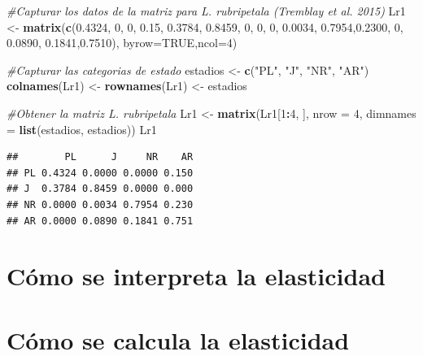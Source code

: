 \documentclass[
]{book}
\newenvironment{Shaded}{\begin{snugshade}}{\end{snugshade}}
\newcommand{\AttributeTok}[1]{\textcolor[rgb]{0.13,0.29,0.53}{#1}}
\newcommand{\CommentTok}[1]{\textcolor[rgb]{0.56,0.35,0.01}{\textit{#1}}}
\newcommand{\ConstantTok}[1]{\textcolor[rgb]{0.56,0.35,0.01}{#1}}
\newcommand{\DecValTok}[1]{\textcolor[rgb]{0.00,0.00,0.81}{#1}}
\newcommand{\FloatTok}[1]{\textcolor[rgb]{0.00,0.00,0.81}{#1}}
\newcommand{\FunctionTok}[1]{\textcolor[rgb]{0.13,0.29,0.53}{\textbf{#1}}}
\newcommand{\NormalTok}[1]{#1}
\newcommand{\OtherTok}[1]{\textcolor[rgb]{0.56,0.35,0.01}{#1}}
\newcommand{\SpecialCharTok}[1]{\textcolor[rgb]{0.81,0.36,0.00}{\textbf{#1}}}
\newcommand{\StringTok}[1]{\textcolor[rgb]{0.31,0.60,0.02}{#1}}
\theoremstyle{definition}
\theoremstyle{definition}
\theoremstyle{definition}
\theoremstyle{definition}
\theoremstyle{remark}
\begin{document}
\begin{Shaded}
\begin{Highlighting}[]
\CommentTok{\#Capturar los datos de la matriz para L. rubripetala (Tremblay et al. 2015)}
\NormalTok{Lr1 }\OtherTok{\textless{}{-}} \FunctionTok{matrix}\NormalTok{(}\FunctionTok{c}\NormalTok{(}\FloatTok{0.4324}\NormalTok{, }\DecValTok{0}\NormalTok{,      }\DecValTok{0}\NormalTok{,     }\FloatTok{0.15}\NormalTok{,}
               \FloatTok{0.3784}\NormalTok{, }\FloatTok{0.8459}\NormalTok{, }\DecValTok{0}\NormalTok{,     }\DecValTok{0}\NormalTok{,}
               \DecValTok{0}\NormalTok{,      }\FloatTok{0.0034}\NormalTok{, }\FloatTok{0.7954}\NormalTok{,}\FloatTok{0.2300}\NormalTok{,}
               \DecValTok{0}\NormalTok{,      }\FloatTok{0.0890}\NormalTok{, }\FloatTok{0.1841}\NormalTok{,}\FloatTok{0.7510}\NormalTok{), }\AttributeTok{byrow=}\ConstantTok{TRUE}\NormalTok{,}\AttributeTok{ncol=}\DecValTok{4}\NormalTok{)}

\CommentTok{\#Capturar las categorias de estado}
\NormalTok{estadios }\OtherTok{\textless{}{-}} \FunctionTok{c}\NormalTok{(}\StringTok{"PL"}\NormalTok{, }\StringTok{"J"}\NormalTok{, }\StringTok{"NR"}\NormalTok{, }\StringTok{"AR"}\NormalTok{)}
\FunctionTok{colnames}\NormalTok{(Lr1) }\OtherTok{\textless{}{-}} \FunctionTok{rownames}\NormalTok{(Lr1) }\OtherTok{\textless{}{-}}\NormalTok{ estadios}

\CommentTok{\#Obtener la matriz L. rubripetala }
\NormalTok{Lr1 }\OtherTok{\textless{}{-}} \FunctionTok{matrix}\NormalTok{(Lr1[}\DecValTok{1}\SpecialCharTok{:}\DecValTok{4}\NormalTok{, ], }\AttributeTok{nrow =} \DecValTok{4}\NormalTok{, }\AttributeTok{dimnames =} \FunctionTok{list}\NormalTok{(estadios, estadios))}
\NormalTok{Lr1}
\end{Highlighting}
\end{Shaded}

\begin{verbatim}
##        PL      J     NR    AR
## PL 0.4324 0.0000 0.0000 0.150
## J  0.3784 0.8459 0.0000 0.000
## NR 0.0000 0.0034 0.7954 0.230
## AR 0.0000 0.0890 0.1841 0.751
\end{verbatim}

\section{Cómo se interpreta la elasticidad}\label{cuxf3mo-se-interpreta-la-elasticidad}

\section{Cómo se calcula la elasticidad}\label{cuxf3mo-se-calcula-la-elasticidad}
\end{document}
